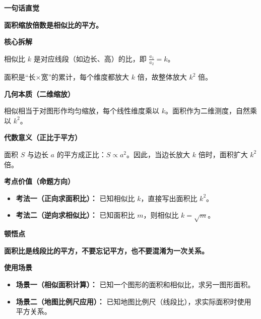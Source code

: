 \begin{explanationbox}
	\textbf{\textcolor{CExplanation}{一句话直觉}}

	\textbf{面积缩放倍数是相似比的平方。}

	\medskip
	\textbf{\textcolor{CExplanation}{核心拆解}}
	\begin{description}[style=nextline, leftmargin=2.8em, labelsep=0.5em, itemsep=0.45em]
		\item[\textbf{要点一（相似比定义）：}] 相似比 $k$ 是对应线段（如边长、高）的比，即 $\displaystyle\frac{a_1}{a_2}=k$。
		\item[\textbf{要点二（面积整体乘积）：}] 面积是“长$\times$宽”的累计，每个维度都放大 $k$ 倍，故整体放大 $k^2$ 倍。
	\end{description}

	\medskip
	\textbf{\textcolor{CExplanation}{几何本质（二维缩放）}}

	相似相当于对图形作均匀缩放，每个线性维度乘以 $k$。面积作为二维测度，自然乘以 $k^2$。

	\medskip
	\textbf{\textcolor{CExplanation}{代数意义（正比于平方）}}

	面积 $S$ 与边长 $a$ 的平方成正比：$S \propto a^2$。因此，当边长放大 $k$ 倍时，面积扩大 $k^2$ 倍。

	\medskip
	\textbf{\textcolor{CExplanation}{考点价值（命题方向）}}
	\begin{itemize}[leftmargin=*, itemsep=0.5em, topsep=0.4em]
		\item \textbf{考法一（正向求面积比）：} 已知相似比 $k$，直接写出面积比 $k^2$。
		\item \textbf{考法二（逆向求相似比）：} 已知面积比 $m$，则相似比 $k=\sqrt{m}$。
	\end{itemize}

	\medskip
	\textbf{\textcolor{CExplanation}{顿悟点}}

	\textbf{面积比是线段比的平方，不要忘记平方，也不要混淆为一次关系。}

	\medskip
	\textbf{\textcolor{CExplanation}{使用场景}}
	\begin{itemize}[leftmargin=*, itemsep=0.5em, topsep=0.4em]
		\item \textbf{场景一（相似面积计算）：} 已知一个图形的面积和相似比，求另一图形面积。
		\item \textbf{场景二（地图比例尺应用）：} 已知地图比例尺（线段比），求实际面积时使用平方关系。
	\end{itemize}
\end{explanationbox}
